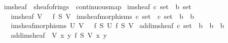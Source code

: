 \documentclass[12pt]{scrartcl}
\begin{document}
\begin{isabelle}
\isamarkupfalse%
\ im{\isacharunderscore}{\kern0pt}sheaf\ {\isacharequal}{\kern0pt}\ sheaf{\isacharunderscore}{\kern0pt}of{\isacharunderscore}{\kern0pt}rings\ {\isacharplus}{\kern0pt}\ continuous{\isacharunderscore}{\kern0pt}map\isanewline
{}\isanewline
\isanewline
{}\isamarkupfalse%
\ im{\isacharunderscore}{\kern0pt}sheaf{\isacharcolon}{\kern0pt}{\isacharcolon}{\kern0pt}\ {\isachardoublequoteopen}{\isacharprime}{\kern0pt}c\ set\ {\isacharequal}{\kern0pt}{\isachargreater}{\kern0pt}\ {\isacharprime}{\kern0pt}b\ set{\isachardoublequoteclose}\isanewline
\ \ \ {\isachardoublequoteopen}im{\isacharunderscore}{\kern0pt}sheaf\ V\ {\isasymequiv}\ {\isasymFF}\ {\isacharparenleft}{\kern0pt}f\isactrlsup {\isasyminverse}\ S\ V{\isacharparenright}{\kern0pt}{\isachardoublequoteclose}\isanewline
\isanewline
{}\isamarkupfalse%
\ im{\isacharunderscore}{\kern0pt}sheaf{\isacharunderscore}{\kern0pt}morphisms{\isacharcolon}{\kern0pt}{\isacharcolon}{\kern0pt}\ {\isachardoublequoteopen}{\isacharprime}{\kern0pt}c\ set\ {\isasymRightarrow}\ {\isacharprime}{\kern0pt}c\ set\ {\isasymRightarrow}\ {\isacharparenleft}{\kern0pt}{\isacharprime}{\kern0pt}b\ {\isasymRightarrow}\ {\isacharprime}{\kern0pt}b{\isacharparenright}{\kern0pt}{\isachardoublequoteclose}\isanewline
\ \ \ {\isachardoublequoteopen}im{\isacharunderscore}{\kern0pt}sheaf{\isacharunderscore}{\kern0pt}morphisms\ U\ V\ {\isasymequiv}\ {\isasymrho}\ {\isacharparenleft}{\kern0pt}f\isactrlsup {\isasyminverse}\ S\ U{\isacharparenright}{\kern0pt}\ {\isacharparenleft}{\kern0pt}f\isactrlsup {\isasyminverse}\ S\ V{\isacharparenright}{\kern0pt}{\isachardoublequoteclose}\isanewline
\isanewline
{}\isamarkupfalse%
\ add{\isacharunderscore}{\kern0pt}im{\isacharunderscore}{\kern0pt}sheaf{\isacharcolon}{\kern0pt}{\isacharcolon}{\kern0pt}\ {\isachardoublequoteopen}{\isacharprime}{\kern0pt}c\ set\ {\isasymRightarrow}\ {\isacharprime}{\kern0pt}b\ {\isasymRightarrow}\ {\isacharprime}{\kern0pt}b\ {\isasymRightarrow}\ {\isacharprime}{\kern0pt}b{\isachardoublequoteclose}\isanewline
\ \ \ {\isachardoublequoteopen}add{\isacharunderscore}{\kern0pt}im{\isacharunderscore}{\kern0pt}sheaf\ {\isasymequiv}\ {\isasymlambda}V\ x\ y{\isachardot}{\kern0pt}\ {\isacharplus}{\kern0pt}\isactrlbsub {\isacharparenleft}{\kern0pt}f\isactrlsup {\isasyminverse}\ S\ V{\isacharparenright}{\kern0pt}\isactrlesub \ x\ y{\isachardoublequoteclose}\isanewline

\end{isabelle}
\end{document}
